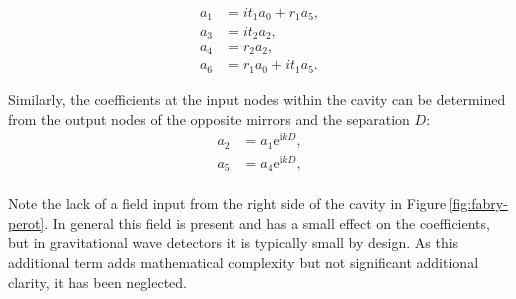\begin{equation}
  \label{eq:fabry-perot-coefficients-1}
  \begin{split}
    a_1 &= it_1 a_0 + r_1 a_5, \\
    a_3 &= it_2 a_2, \\
    a_4 &= r_2 a_2, \\
    a_6 &= r_1 a_0 + it_1 a_5.
  \end{split}
\end{equation}

Similarly, the coefficients at the input nodes within the cavity can be determined from the output nodes of the opposite mirrors and the separation $D$:
\begin{equation}
  \label{eq:fabry-perot-coefficients-2}
  \begin{split}
    a_2 &= a_1 \text{e}^{\text{i} kD}, \\
    a_5 &= a_4 \text{e}^{\text{i} kD}, \\
  \end{split}
\end{equation}

Note the lack of a field input from the right side of the cavity in Figure\,\ref{fig:fabry-perot}. In general this field is present and has a small effect on the coefficients, but in gravitational wave detectors it is typically small by design. As this additional term adds mathematical complexity but not significant additional clarity, it has been neglected.

